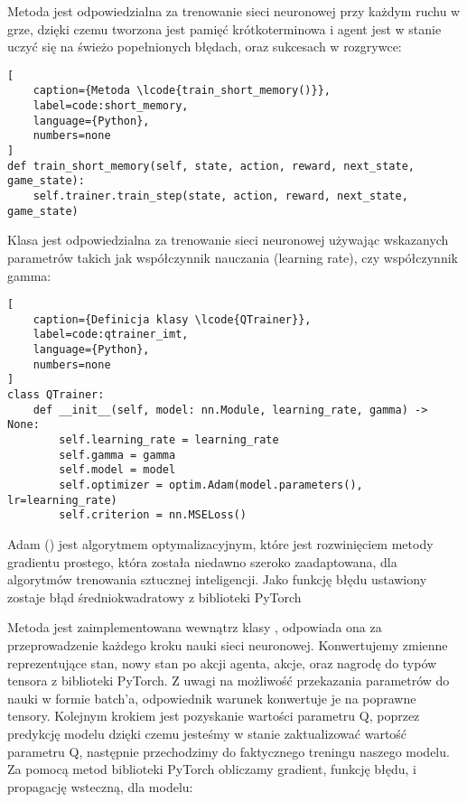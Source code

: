 Metoda  jest odpowiedzialna za trenowanie sieci neuronowej przy każdym ruchu w grze, dzięki czemu tworzona jest pamięć krótkoterminowa i agent jest w stanie uczyć się na świeżo popełnionych błędach, oraz sukcesach w rozgrywce:

\begin{onepage}
    \begin{lstlisting}[
    caption={Metoda \lcode{train_short_memory()}},
    label=code:short_memory,
    language={Python},
    numbers=none
]
def train_short_memory(self, state, action, reward, next_state, game_state):
    self.trainer.train_step(state, action, reward, next_state, game_state)

    \end{lstlisting}
\end{onepage}

Klasa  jest odpowiedzialna za trenowanie sieci neuronowej używając wskazanych parametrów takich jak współczynnik nauczania (learning rate), czy współczynnik gamma:

\begin{onepage}
    \begin{lstlisting}[
    caption={Definicja klasy \lcode{QTrainer}},
    label=code:qtrainer_imt,
    language={Python},
    numbers=none
]
class QTrainer:
    def __init__(self, model: nn.Module, learning_rate, gamma) -> None:
        self.learning_rate = learning_rate
        self.gamma = gamma
        self.model = model
        self.optimizer = optim.Adam(model.parameters(), lr=learning_rate)
        self.criterion = nn.MSELoss()
    \end{lstlisting}
\end{onepage}


Adam () \cite{AdamOpt1} \cite{AdamOpt2} jest algorytmem optymalizacyjnym, które jest rozwinięciem metody gradientu prostego, która została niedawno szeroko zaadaptowana, dla algorytmów trenowania sztucznej inteligencji. Jako funkcję błędu ustawiony zostaje błąd średniokwadratowy z biblioteki PyTorch 

\clearpage

Metoda  jest zaimplementowana wewnątrz klasy , odpowiada ona za przeprowadzenie każdego kroku nauki sieci neuronowej. Konwertujemy zmienne reprezentujące stan, nowy stan po akcji agenta, akcje, oraz nagrodę do typów tensora z biblioteki PyTorch. Z uwagi na możliwość przekazania parametrów do nauki w formie batch'a, odpowiednik warunek konwertuje je na poprawne tensory. Kolejnym krokiem jest pozyskanie wartości parametru Q, poprzez predykcję modelu dzięki czemu jesteśmy w stanie zaktualizować wartość parametru Q, następnie przechodzimy do faktycznego treningu naszego modelu. Za pomocą metod biblioteki PyTorch obliczamy gradient, funkcję błędu, i propagację wsteczną, dla modelu:

